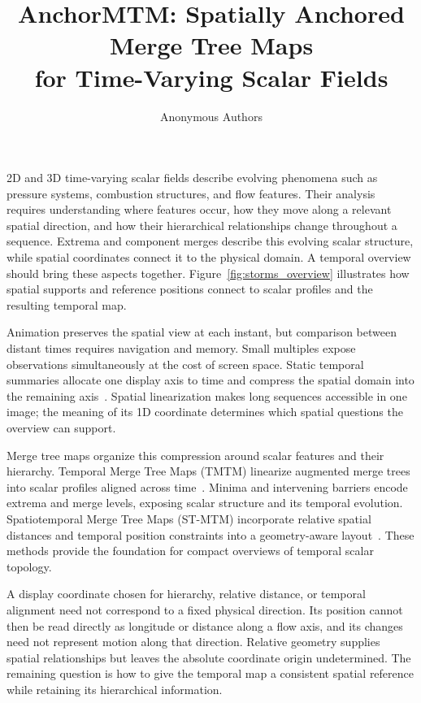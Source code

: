 \documentclass[review]{vgtc}
\title{AnchorMTM: Spatially Anchored Merge Tree Maps\\for Time-Varying Scalar Fields}
\author{Anonymous Authors}
\begin{document}
\maketitle
\raggedbottom
\setlength{\emergencystretch}{1.5em}
2D and 3D time-varying scalar fields describe evolving phenomena such as pressure systems, combustion structures, and flow features. Their analysis requires understanding where features occur, how they move along a relevant spatial direction, and how their hierarchical relationships change throughout a sequence. Extrema and component merges describe this evolving scalar structure, while spatial coordinates connect it to the physical domain. A temporal overview should bring these aspects together. Figure~\ref{fig:storms_overview} illustrates how spatial supports and reference positions connect to scalar profiles and the resulting temporal map.

Animation preserves the spatial view at each instant, but comparison between distant times requires navigation and memory. Small multiples expose observations simultaneously at the cost of screen space. Static temporal summaries allocate one display axis to time and compress the spatial domain into the remaining axis~\cite{Tversky:2002:Animation,Robertson:2008:Animation,Bach:2017:STC}. Spatial linearization makes long sequences accessible in one image; the meaning of its 1D coordinate determines which spatial questions the overview can support.

Merge tree maps organize this compression around scalar features and their hierarchy. Temporal Merge Tree Maps (TMTM) linearize augmented merge trees into scalar profiles aligned across time~\cite{Koepp:2023:TMTM}. Minima and intervening barriers encode extrema and merge levels, exposing scalar structure and its temporal evolution. Spatiotemporal Merge Tree Maps (ST-MTM) incorporate relative spatial distances and temporal position constraints into a geometry-aware layout~\cite{STMTM:2026}. These methods provide the foundation for compact overviews of temporal scalar topology.

A display coordinate chosen for hierarchy, relative distance, or temporal alignment need not correspond to a fixed physical direction. Its position cannot then be read directly as longitude or distance along a flow axis, and its changes need not represent motion along that direction. Relative geometry supplies spatial relationships but leaves the absolute coordinate origin undetermined. The remaining question is how to give the temporal map a consistent spatial reference while retaining its hierarchical information.
\end{document}
